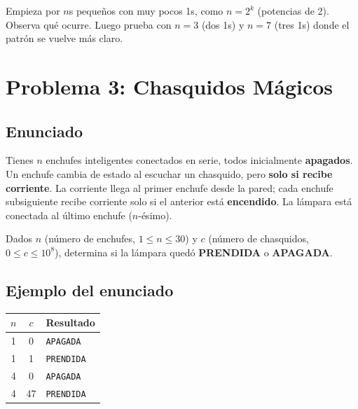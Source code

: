 \documentclass[12pt, oneside]{article}
\begin{document}
\vspace{2cm}

\begin{consejo}
  Empieza por $n$s pequeños con muy pocos 1s, como $n = 2^k$ (potencias de 2).
  Observa qué ocurre.  Luego prueba con $n=3$ (dos 1s) y $n=7$ (tres 1s) donde
  el patrón se vuelve más claro.
\end{consejo}

\newpage

\section{Problema 3: Chasquidos Mágicos}

\subsection{Enunciado}

Tienes $n$ enchufes inteligentes conectados en serie, todos inicialmente
\textbf{apagados}.  Un enchufe cambia de estado al escuchar un chasquido,
pero \textbf{solo si recibe corriente}.  La corriente llega al primer enchufe
desde la pared; cada enchufe subsiguiente recibe corriente solo si el anterior
está \textbf{encendido}.  La lámpara está conectada al último enchufe ($n$-ésimo).

Dados $n$ (número de enchufes, $1 \le n \le 30$) y $c$ (número de chasquidos,
$0 \le c \le 10^8$), determina si la lámpara quedó \textbf{PRENDIDA} o
\textbf{APAGADA}.

\subsection{Ejemplo del enunciado}

\begin{center}
\begin{tabular}{ccp{6cm}}
  \toprule
  $n$ & $c$ & \textbf{Resultado} \\
  \midrule
  1 & 0  & \texttt{APAGADA} \\
  1 & 1  & \texttt{PRENDIDA} \\
  4 & 0  & \texttt{APAGADA} \\
  4 & 47 & \texttt{PRENDIDA} \\
  \bottomrule
\end{tabular}
\end{center}
\end{document}
